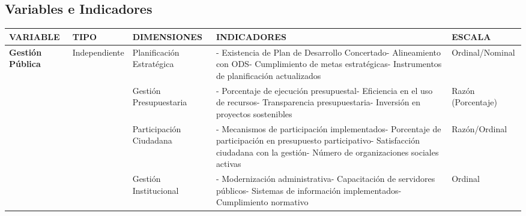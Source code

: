 \documentclass[
  man,
  floatsintext,
  longtable,
  a4paper,
  nolmodern,
  notxfonts,
  notimes,
  12pt,
  colorlinks=true,linkcolor=blue,citecolor=blue,urlcolor=blue]{apa7}
\newcounter{none} %
\begin{document}
\subsection{Variables e Indicadores}\label{variables-e-indicadores-5}

{\def\LTcaptype{none} %
\begin{longtable}[]{@{}
  >{\raggedright\arraybackslash}p{}
  >{\raggedright\arraybackslash}p{}
  >{\raggedright\arraybackslash}p{}
  >{\raggedright\arraybackslash}p{}
  >{\raggedright\arraybackslash}p{}@{}}
\toprule\noalign{}
\begin{minipage}[b]{\linewidth}\raggedright
VARIABLE
\end{minipage} & \begin{minipage}[b]{\linewidth}\raggedright
TIPO
\end{minipage} & \begin{minipage}[b]{\linewidth}\raggedright
DIMENSIONES
\end{minipage} & \begin{minipage}[b]{\linewidth}\raggedright
INDICADORES
\end{minipage} & \begin{minipage}[b]{\linewidth}\raggedright
ESCALA
\end{minipage} \\
\midrule\noalign{}
\endhead
\bottomrule\noalign{}
\endlastfoot
\textbf{Gestión Pública} & Independiente & Planificación Estratégica & -
Existencia de Plan de Desarrollo Concertado- Alineamiento con ODS-
Cumplimiento de metas estratégicas- Instrumentos de planificación
actualizados & Ordinal/Nominal \\
& & Gestión Presupuestaria & - Porcentaje de ejecución presupuestal-
Eficiencia en el uso de recursos- Transparencia presupuestaria-
Inversión en proyectos sostenibles & Razón (Porcentaje) \\
& & Participación Ciudadana & - Mecanismos de participación
implementados- Porcentaje de participación en presupuesto participativo-
Satisfacción ciudadana con la gestión- Número de organizaciones sociales
activas & Razón/Ordinal \\
& & Gestión Institucional & - Modernización administrativa- Capacitación
de servidores públicos- Sistemas de información implementados-
Cumplimiento normativo & Ordinal \\

\end{longtable}}
\end{document}
